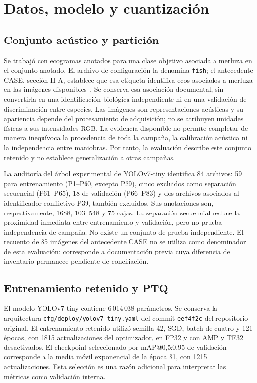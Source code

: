 \documentclass[10pt,conference,a4paper]{elektron}
\begin{document}
\section{Datos, modelo y cuantización}
\subsection{Conjunto acústico y partición}
Se trabajó con ecogramas anotados para una clase objetivo asociada a merluza en el conjunto anotado. El archivo de configuración la denomina \texttt{fish}; el antecedente CASE, sección II-A, establece que esa etiqueta identifica ecos asociados a merluza en las imágenes disponibles~\cite{mozo2026case}. Se conserva esa asociación documental, sin convertirla en una identificación biológica independiente ni en una validación de discriminación entre especies. Las imágenes son representaciones acústicas y su apariencia depende del procesamiento de adquisición; no se atribuyen unidades físicas a sus intensidades RGB. La evidencia disponible no permite completar de manera inequívoca la procedencia de toda la campaña, la calibración acústica ni la independencia entre maniobras. Por tanto, la evaluación describe este conjunto retenido y no establece generalización a otras campañas.

La auditoría del árbol experimental de YOLOv7-tiny identifica 84 archivos: 59 para entrenamiento (P1--P60, excepto P39), cinco excluidos como separación secuencial (P61--P65), 18 de validación (P66--P83) y dos archivos asociados al identificador conflictivo P39, también excluidos. Sus anotaciones son, respectivamente, 1688, 103, 548 y 75 cajas. La separación secuencial reduce la proximidad inmediata entre entrenamiento y validación, pero no prueba independencia de campaña. No existe un conjunto de prueba independiente. El recuento de 85 imágenes del antecedente CASE no se utiliza como denominador de esta evaluación: corresponde a documentación previa cuya diferencia de inventario permanece pendiente de conciliación.

\subsection{Entrenamiento retenido y PTQ}
El modelo YOLOv7-tiny contiene 6\,014\,038 parámetros. Se conserva la arquitectura \texttt{cfg/deploy/yolov7-tiny.yaml} del commit \texttt{eef4f2c} del repositorio original. El entrenamiento retenido utilizó semilla 42, SGD, batch de cuatro y 121 épocas, con 1815 actualizaciones del optimizador, en FP32 y con AMP y TF32 desactivados. El checkpoint seleccionado por mAP@0,5:0,95 de validación corresponde a la media móvil exponencial de la época 81, con 1215 actualizaciones. Esta selección es una razón adicional para interpretar las métricas como validación interna.
\end{document}

